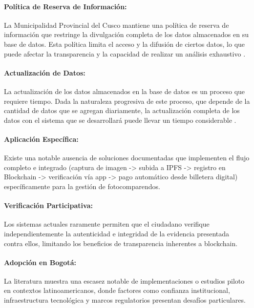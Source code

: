 \documentclass[
    letterpaper, 
    man,   
    spanish,
    12pt,
    donotrepeattitle,
    floatsintext,
    hidelinks %
]{apa7}
\begin{document}
\paragraph{Política de Reserva de Información:}
 La Municipalidad Provincial del Cusco mantiene una política de reserva de información que restringe la divulgación completa de los datos almacenados en su base de datos. Esta política limita el acceso y la difusión de ciertos datos, lo que puede afectar la transparencia y la capacidad de realizar un análisis exhaustivo \parencite{choquevilca2024blockchain}.

\paragraph{Actualización de Datos:}
La actualización de los datos almacenados en la base de datos es un proceso que requiere tiempo. Dada la naturaleza progresiva de este proceso, que depende de la cantidad de datos que se agregan diariamente, la actualización completa de los datos con el sistema que se desarrollará puede llevar un tiempo considerable \parencite{choquevilca2024blockchain}. 

\paragraph{Aplicación Específica:}
Existe una notable ausencia de soluciones documentadas que implementen el flujo completo e integrado (captura de imagen -> subida a IPFS -> registro en Blockchain -> verificación vía app -> pago automático desde billetera digital) específicamente para la gestión de fotocomparendos. \parencite{yousfi2022its, chen2024blockchain}


\paragraph{Verificación Participativa:}
Los sistemas actuales raramente permiten que el ciudadano verifique independientemente la autenticidad e integridad de la evidencia presentada contra ellos, limitando los beneficios de transparencia inherentes a blockchain. 

\paragraph{Adopción en Bogotá:}
 La literatura muestra una escasez notable de implementaciones o estudios piloto en contextos latinoamericanos, donde factores como confianza institucional, infraestructura tecnológica y marcos regulatorios presentan desafíos particulares. \parencite{choquevilca2024blockchain, rezabala2025blockchain}
\end{document}
